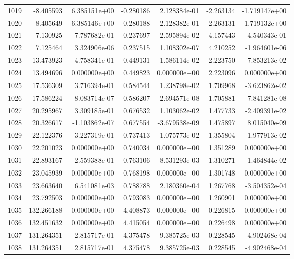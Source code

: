 \begin{tabular}{rrrrrrr}
1019 &  -8.405593 &  6.385151e+00 & -0.280186 &  2.128384e-01 &   -2.263134 & -1.719147e+00 \\
1020 &  -8.405649 & -6.385146e+00 & -0.280188 & -2.128382e-01 &   -2.263131 &  1.719132e+00 \\
1021 &   7.130925 &  7.787682e-01 &  0.237697 &  2.595894e-02 &    4.157443 & -4.540343e-01 \\
1022 &   7.125464 &  3.324906e-06 &  0.237515 &  1.108302e-07 &    4.210252 & -1.964601e-06 \\
1023 &  13.473923 &  4.758341e-01 &  0.449131 &  1.586114e-02 &    2.223750 & -7.853213e-02 \\
1024 &  13.494696 &  0.000000e+00 &  0.449823 &  0.000000e+00 &    2.223096 &  0.000000e+00 \\
1025 &  17.536309 &  3.716394e-01 &  0.584544 &  1.238798e-02 &    1.709968 & -3.623862e-02 \\
1026 &  17.586224 & -8.083714e-07 &  0.586207 & -2.694571e-08 &    1.705881 &  7.841281e-08 \\
1027 &  20.295967 &  3.309185e-01 &  0.676532 &  1.103062e-02 &    1.477733 & -2.409391e-02 \\
1028 &  20.326617 & -1.103862e-07 &  0.677554 & -3.679538e-09 &    1.475897 &  8.015040e-09 \\
1029 &  22.122376 &  3.227319e-01 &  0.737413 &  1.075773e-02 &    1.355804 & -1.977913e-02 \\
1030 &  22.201023 &  0.000000e+00 &  0.740034 &  0.000000e+00 &    1.351289 &  0.000000e+00 \\
1031 &  22.893167 &  2.559388e-01 &  0.763106 &  8.531293e-03 &    1.310271 & -1.464844e-02 \\
1032 &  23.045939 &  0.000000e+00 &  0.768198 &  0.000000e+00 &    1.301748 &  0.000000e+00 \\
1033 &  23.663640 &  6.541081e-03 &  0.788788 &  2.180360e-04 &    1.267768 & -3.504352e-04 \\
1034 &  23.792503 &  0.000000e+00 &  0.793083 &  0.000000e+00 &    1.260901 &  0.000000e+00 \\
1035 & 132.266188 &  0.000000e+00 &  4.408873 &  0.000000e+00 &    0.226815 &  0.000000e+00 \\
1036 & 132.451632 &  0.000000e+00 &  4.415054 &  0.000000e+00 &    0.226498 &  0.000000e+00 \\
1037 & 131.264351 & -2.815717e-01 &  4.375478 & -9.385725e-03 &    0.228545 &  4.902468e-04 \\
1038 & 131.264351 &  2.815717e-01 &  4.375478 &  9.385725e-03 &    0.228545 & -4.902468e-04 \\

\end{tabular}
